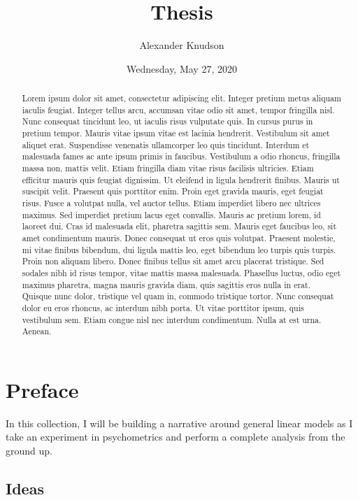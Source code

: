 \documentclass[
]{article}
\title{Thesis}
\author{Alexander Knudson}
\date{Wednesday, May 27, 2020}
\begin{document}
\maketitle
\begin{abstract}
Lorem ipsum dolor sit amet, consectetur adipiscing elit. Integer pretium metus aliquam iaculis feugiat. Integer tellus arcu, accumsan vitae odio sit amet, tempor fringilla nisl. Nunc consequat tincidunt leo, ut iaculis risus vulputate quis. In cursus purus in pretium tempor. Mauris vitae ipsum vitae est lacinia hendrerit. Vestibulum sit amet aliquet erat. Suspendisse venenatis ullamcorper leo quis tincidunt. Interdum et malesuada fames ac ante ipsum primis in faucibus. Vestibulum a odio rhoncus, fringilla massa non, mattis velit. Etiam fringilla diam vitae risus facilisis ultricies. Etiam efficitur mauris quis feugiat dignissim. Ut eleifend in ligula hendrerit finibus. Mauris ut suscipit velit. Praesent quis porttitor enim. Proin eget gravida mauris, eget feugiat risus. Fusce a volutpat nulla, vel auctor tellus. Etiam imperdiet libero nec ultrices maximus. Sed imperdiet pretium lacus eget convallis. Mauris ac pretium lorem, id laoreet dui. Cras id malesuada elit, pharetra sagittis sem. Mauris eget faucibus leo, sit amet condimentum mauris. Donec consequat ut eros quis volutpat. Praesent molestie, mi vitae finibus bibendum, dui ligula mattis leo, eget bibendum leo turpis quis turpis. Proin non aliquam libero. Donec finibus tellus sit amet arcu placerat tristique. Sed sodales nibh id risus tempor, vitae mattis massa malesuada. Phasellus luctus, odio eget maximus pharetra, magna mauris gravida diam, quis sagittis eros nulla in erat. Quisque nunc dolor, tristique vel quam in, commodo tristique tortor. Nunc consequat dolor eu eros rhoncus, ac interdum nibh porta. Ut vitae porttitor ipsum, quis vestibulum sem. Etiam congue nisl nec interdum condimentum. Nulla at est urna. Aenean.
\end{abstract}

{
\setcounter{tocdepth}{3}
\tableofcontents
}
\hypertarget{preface}{%
\section*{Preface}\label{preface}}


In this collection, I will be building a narrative around general linear models as I take an experiment in psychometrics and perform a complete analysis from the ground up.

\hypertarget{ideas}{%
\subsection*{Ideas}\label{ideas}}
\end{document}
